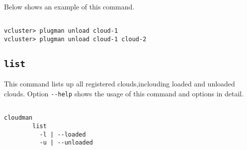 \documentclass[11pt]{article}
\def \ttt{\texttt}
\def \vb{\verb}
\begin{document}
Below shows an example of this command.

\begin{Verbatim}[fontfamily=courier, fontsize = \small, obeytabs
=true, tabsize=4, frame=lines]

vcluster> plugman unload cloud-1
vcluster> plugman unload cloud-1 cloud-2

\end{Verbatim}




\subsection{\ttt{list}}
This command lists up all registered clouds,inclouding loaded and unloaded clouds. Option \vb+--help+ shows the usage of this command and options in detail.

\begin{Verbatim}[fontfamily=courier, fontsize = \small, obeytabs
=true, tabsize=4, frame=lines]

cloudman 
        list
          -l | --loaded
          -u | --unloaded
\end{Verbatim}
\end{document}
